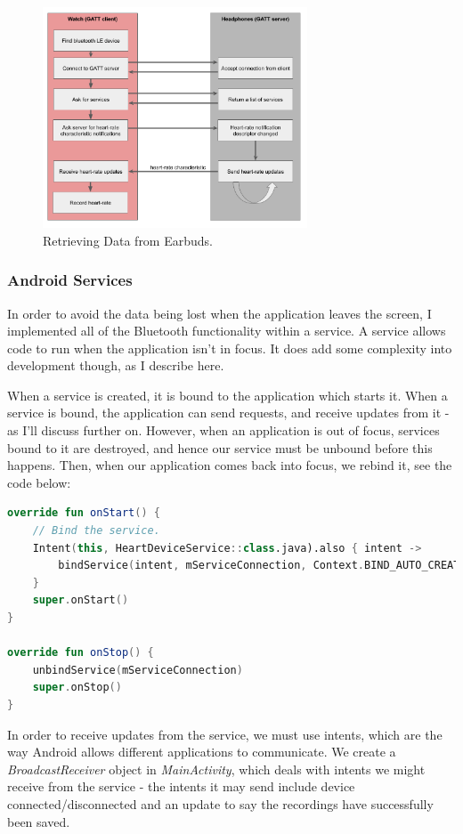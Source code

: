 \documentclass[12pt,a4paper,twoside,openany]{report}
\begin{document}
\begin{figure}[H]
	\centerline{\includegraphics[width=0.7\textwidth]{figs/gatt-flow.png}}
	\caption{Retrieving Data from Earbuds.}
	\label{fig:gatt-flow}
\end{figure}

\subsubsection{Android Services}

In order to avoid the data being lost when the application leaves the screen,
I implemented all of the Bluetooth functionality within a service. A service
allows code to run when the application isn't in focus. It does add some
complexity into development though, as I describe here.

When a service is created, it is bound to the application which starts it.
When a service is bound, the application can send requests, and receive
updates from it - as I'll discuss further on. However, when an application is
out of focus, services bound to it are destroyed, and hence our service must
be unbound before this happens. Then, when our application comes back into
focus, we rebind it, see the code below:

\begin{lstlisting}[language=Kotlin]
override fun onStart() {
    // Bind the service.
    Intent(this, HeartDeviceService::class.java).also { intent ->
        bindService(intent, mServiceConnection, Context.BIND_AUTO_CREATE)
    }
    super.onStart()
}

override fun onStop() {
    unbindService(mServiceConnection)
    super.onStop()
}
\end{lstlisting}

In order to receive updates from the service, we must use intents, which are
the way Android allows different applications to communicate. 
We create a \emph{BroadcastReceiver}
object in \emph{MainActivity}, which deals with intents we might receive from
the service - the intents it may send include device connected/disconnected
and an update to say the recordings have successfully been saved. 
\end{document}
